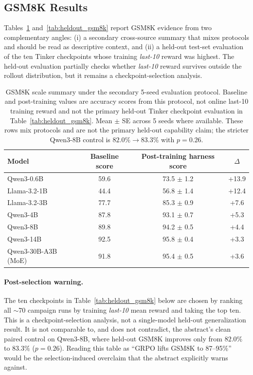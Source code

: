 \documentclass{article}
\begin{document}
\subsection{GSM8K Results}
\label{sec:gsm8k_results}

Tables~\ref{tab:results_gsm8k} and~\ref{tab:heldout_gsm8k} report GSM8K
evidence from two complementary angles: (i) a secondary cross-source summary
that mixes protocols and should be read as descriptive context, and (ii) a
held-out test-set evaluation of the
ten Tinker checkpoints whose training \emph{last-10} reward was highest.
The held-out evaluation partially checks whether \emph{last-10} reward survives
outside the rollout distribution, but it remains a checkpoint-selection analysis.

\begin{table}[htbp]
\centering
\caption{GSM8K scale summary under the secondary 5-seed evaluation protocol. Baseline and post-training values are accuracy scores from this protocol, not online last-10 training reward and not the primary held-out Tinker checkpoint evaluation in Table~\ref{tab:heldout_gsm8k}. Mean $\pm$ SE across 5 seeds where available. These rows mix protocols and are not the primary held-out capability claim; the stricter Qwen3-8B control is $82.0\%\!\to\!83.3\%$ with $p=0.26$.}
\label{tab:results_gsm8k}
\begin{tabular}{lccc}
\toprule
\textbf{Model} & \textbf{Baseline score} & \textbf{Post-training harness score} & \textbf{$\Delta$} \\
\midrule
Qwen3-0.6B & 59.6 & 73.5 $\pm$ 1.2 & +13.9 \\
Llama-3.2-1B & 44.4 & 56.8 $\pm$ 1.4 & +12.4 \\
Llama-3.2-3B & 77.7 & 85.3 $\pm$ 0.9 & +7.6 \\
Qwen3-4B & 87.8 & 93.1 $\pm$ 0.7 & +5.3 \\
Qwen3-8B & 89.8 & 94.2 $\pm$ 0.5 & +4.4 \\
Qwen3-14B & 92.5 & 95.8 $\pm$ 0.4 & +3.3 \\
Qwen3-30B-A3B (MoE) & 91.8 & 95.4 $\pm$ 0.5 & +3.6 \\
\bottomrule
\end{tabular}
\end{table}

\paragraph{Post-selection warning.}
The ten checkpoints in Table~\ref{tab:heldout_gsm8k} below are chosen by
ranking all $\sim$70 campaign runs by training \emph{last-10} mean reward and
taking the top ten.  This is a checkpoint-selection analysis, not a
single-model held-out generalization result.  It is not comparable to, and
does not contradict, the abstract's clean paired control on Qwen3-8B, where
held-out GSM8K improves only from $82.0\%$ to $83.3\%$ ($p=0.26$).  Reading
this table as ``GRPO lifts GSM8K to 87--95\%'' would be the selection-induced
overclaim that the abstract explicitly warns against.
\end{document}
